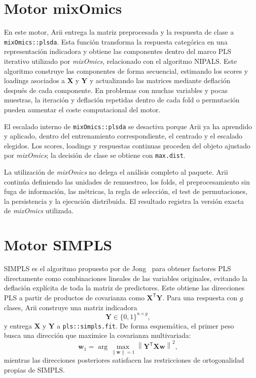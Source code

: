 \documentclass[11pt,a4paper,openany]{report}
\newcommand{\mixOmics}{\textit{mixOmics}}
\newcommand{\code}[1]{\texttt{#1}}
\newcommand{\vect}[1]{\boldsymbol{#1}}
\begin{document}
\newpage

\section{Motor mixOmics}

En este motor, Arii entrega la matriz preprocesada y la respuesta de clase a \code{mixOmics::plsda}. Esta función transforma la respuesta categórica en una representación indicadora y obtiene las componentes dentro del marco PLS iterativo utilizado por \mixOmics, relacionado con el algoritmo NIPALS. Este algoritmo construye las componentes de forma secuencial, estimando los scores y loadings asociados a $\vect{X}$ y $\vect{Y}$ y actualizando las matrices mediante deflación después de cada componente. En problemas con muchas variables y pocas muestras, la iteración y deflación repetidas dentro de cada fold o permutación pueden aumentar el coste computacional del motor.

El escalado interno de \code{mixOmics::plsda} se desactiva porque Arii ya ha aprendido y aplicado, dentro del entrenamiento correspondiente, el centrado y el escalado elegidos. Los scores, loadings y respuestas continuas proceden del objeto ajustado por \mixOmics; la decisión de clase se obtiene con \code{max.dist}.

La utilización de \mixOmics{} no delega el análisis completo al paquete. Arii continúa definiendo las unidades de remuestreo, los folds, el preprocesamiento sin fuga de información, las métricas, la regla de selección, el test de permutaciones, la persistencia y la ejecución distribuida. El resultado registra la versión exacta de \mixOmics{} utilizada.

\section{Motor SIMPLS}

SIMPLS es el algoritmo propuesto por de Jong~\cite{dejong1993} para obtener factores PLS directamente como combinaciones lineales de las variables originales, evitando la deflación explícita de toda la matriz de predictores. Este obtiene las direcciones PLS a partir de productos de covarianza como $\vect{X}^{\mathsf T}\vect{Y}$. Para una respuesta con $g$ clases, Arii construye una matriz indicadora
\begin{equation}
  \vect{Y}\in\{0,1\}^{n\times g},
\end{equation}
y entrega $\vect{X}$ y $\vect{Y}$ a \code{pls::simpls.fit}. De forma esquemática, el primer peso busca una dirección que maximice la covarianza multivariada:
\begin{equation}
  \vect{w}_{1}
  =\arg\max_{\lVert\vect{w}\rVert=1}
  \left\lVert\vect{Y}^{\mathsf T}\vect{X}\vect{w}\right\rVert^{2},
\end{equation}
mientras las direcciones posteriores satisfacen las restricciones de ortogonalidad propias de SIMPLS.
\end{document}
